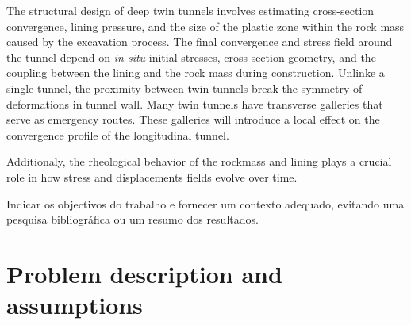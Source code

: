 \documentclass[a4paper,fleqn]{cas-sc}
\begin{document}
The structural design of deep twin tunnels involves estimating cross-section convergence, lining pressure, and the size of the plastic zone within the rock mass caused by the excavation process. The final convergence and stress field around the tunnel depend on \textit{in situ} initial stresses, cross-section geometry, and the coupling between the lining and the rock mass during construction. Unlinke a single tunnel, the proximity between twin tunnels break the symmetry of deformations in tunnel wall. Many twin tunnels have transverse galleries that serve as emergency routes. These galleries will introduce a local effect on the convergence profile of the longitudinal tunnel. 

Additionaly, the rheological behavior of the rockmass and lining plays a crucial role in how stress and displacements fields evolve over time.




Indicar os objectivos do trabalho e fornecer um contexto adequado, evitando uma pesquisa bibliográfica
ou um resumo dos resultados.


\section{Problem description and assumptions}\label{}

\end{document}
